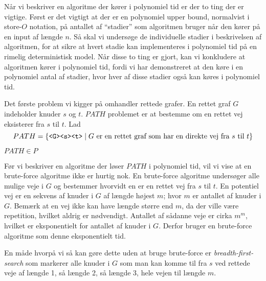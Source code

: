 Når vi beskriver en algoritme der kører i polynomiel tid er der to ting der er vigtige. Først er det vigtigt at der er en polynomiel upper bound, normalvist i store-$O$ notation, på antallet af ``stadier'' som algoritmen bruger når den kører på en input af længde $n$. Så skal vi undersøge de individuelle stadier i beskrivelsen af algoritmen, for at sikre at hvert stadie kan implementeres i polynomiel tid på en rimelig deterministisk model. Når disse to ting er gjort, kan vi konkludere at algoritmen kører i polynomiel tid, fordi vi har demonstreret at den køre i en polynomiel antal af stadier, hvor hver af disse stadier også kan køres i polynomiel tid.

Det første problem vi kigger på omhandler rettede grafer. En rettet graf $G$ indeholder knuder $s$ og $t$. $PATH$ problemet er at bestemme om en rettet vej eksisterer fra $s$ til $t$. Lad
\begin{equation*}
	PATH = \{\text{\texttt{<G><s><t>}} \mid G \text{ er en rettet graf som har en direkte vej fra } s \text{ til } t\}
\end{equation*}

\begin{theorem}
	$PATH \in P$
\end{theorem}

Før vi beskriver en algoritme der løser $PATH$ i polynomiel tid, vil vi vise at en brute-force algoritme ikke er hurtig nok. En brute-force algoritme undersøger alle mulige veje i $G$ og bestemmer hvorvidt en er en rettet vej fra $s$ til $t$. En potentiel vej er en sekvens af knuder i $G$ af længde højest $m$; hvor $m$ er antallet af knuder i $G$. Bemærk at en vej ikke kan have længde større end $m$, da der ville være repetition, hvilket aldrig er nødvendigt. Antallet af sådanne veje er cirka $m^{m}$, hvilket er eksponentielt for antallet af knuder i $G$. Derfor bruger en brute-force algoritme som denne eksponentielt tid.

En måde hvorpå vi så kan gøre dette uden at bruge brute-force er \textit{breadth-first-search} som markerer alle knuder i $G$ som man kan komme til fra $s$ ved rettede veje af længde 1, så længde 2, så længde 3, hele vejen til længde $m$.

